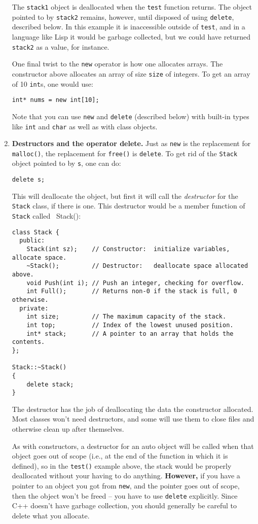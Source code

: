 \begin{enumerate}
The {\tt stack1} object is deallocated when the {\tt test} function
returns.  The object pointed to by {\tt stack2} remains, however,
until disposed of using {\tt delete}, described below.  In this
example it is inaccessible outside of {\tt test}, and in a language
like Lisp it would be garbage collected, but we could have returned
{\tt stack2} as a value, for instance.

One final twist to the {\tt new} operator is how one allocates arrays.
The constructor above allocates an array of size {\tt size} of
integers.  To get an array of 10 {\tt int}s, one would use:
\begin{verbatim}
int* nums = new int[10];
\end{verbatim}

Note that you can use {\tt new} and {\tt delete} (described below)
with built-in types like {\tt int} and {\tt char} as well as with
class objects.

\item {\bf Destructors and the operator delete.}  Just as {\tt new} is the
replacement for {\tt malloc()}, the replacement for {\tt free()} is
{\tt delete}.  To get rid of the {\tt Stack} object pointed
to by {\tt s}, one can do:
\begin{verbatim}
delete s;
\end{verbatim}
This will deallocate the object, but first it will call the
{\it destructor} for the {\tt Stack} class, if there is one.  This
destructor would be a member function of {\tt Stack} called {~Stack()}:
\begin{verbatim}
class Stack {
  public:
    Stack(int sz);    // Constructor:  initialize variables, allocate space.
    ~Stack();         // Destructor:   deallocate space allocated above.
    void Push(int i); // Push an integer, checking for overflow.
    int Full();       // Returns non-0 if the stack is full, 0 otherwise.
  private:
    int size;         // The maximum capacity of the stack.
    int top;          // Index of the lowest unused position.
    int* stack;       // A pointer to an array that holds the contents.
};

Stack::~Stack()
{
    delete stack;
}
\end{verbatim}
The destructor has the job of deallocating the data the constructor
allocated.  Most classes won't need destructors, and some will use
them to close files and otherwise clean up after themselves.

As with constructors, a destructor for an auto object will be called
when that object goes out of scope (i.e., at the end of the function
in which it is defined), so in the {\tt test()} example above, the
stack would be properly deallocated without your having to do
anything.  {\bf However,} if you have a pointer to an object you got
from {\tt new}, and the pointer goes out of scope, then the object
won't be freed -- you have to use {\tt delete} explicitly.  Since C++
doesn't have garbage collection, you should generally be careful to
delete what you allocate.


\end{enumerate}
